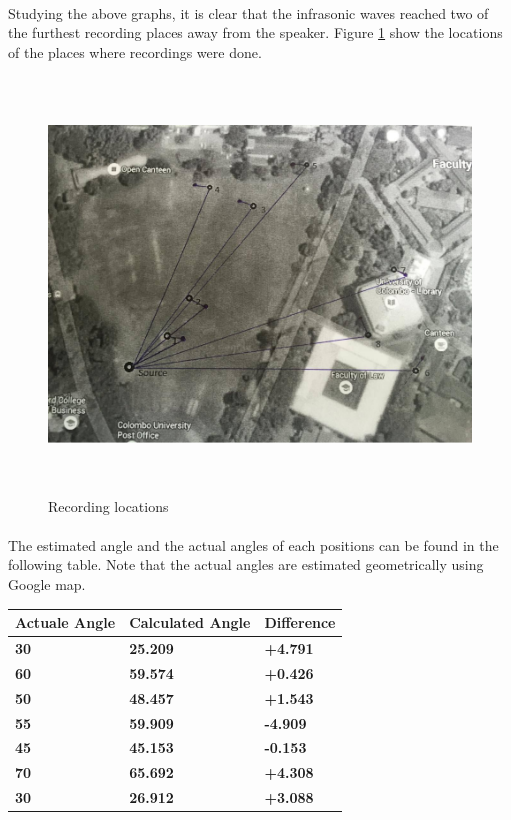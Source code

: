 \documentclass[12pt]{article}
\numberwithin{figure}{section}
\numberwithin{table}{section}
\begin{document}
\paragraph{}
Studying the above graphs, it is clear that the infrasonic waves reached two of the furthest recording places away from the speaker. Figure \ref{d:map} show the locations of the places where recordings were done.

\begin{figure}[H]
\centering
\includegraphics[width=14cm,height=11cm,keepaspectratio]{map.png}
\caption{Recording locations}
\label{d:map}
\end{figure}

\paragraph{}
The estimated angle and the actual angles of each positions can be found in the following table. Note that the actual angles are estimated geometrically using Google map.

\begin{table}[H]
\centering
\begin{tabular}{|m{}|m{}|m{}|} 
\hline
\bf {Actuale Angle} &  {\bf{ Calculated Angle }} & {\bf{ Difference }}\\
\hline
\hline
\bf {30} &  {\bf{ 25.209  }} & {\bf{ +4.791 }}\\
\hline
\bf {60} &  {\bf{ 59.574 }} & {\bf{ +0.426 }}\\
\hline
\bf {50} &  {\bf{ 48.457 }} & {\bf{ +1.543 }}\\
\hline
\bf {55} &  {\bf{ 59.909 }} & {\bf{ -4.909 }}\\
\hline
\bf {45} &  {\bf{ 45.153 }} & {\bf{ -0.153 }}\\
\hline
\bf {70} &  {\bf{ 65.692 }} & {\bf{ +4.308 }}\\
\hline
\bf {30} &  {\bf{ 26.912 }} & {\bf{ +3.088 }}\\
\hline
\end{tabular}
\end{table}
\end{document}

